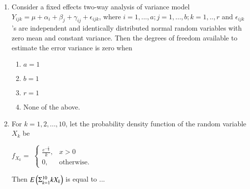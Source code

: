 \documentclass[journal]{IEEEtran}
\begin{document}
\begin{enumerate}
\item
Consider a fixed effects two-way analysis of variance model $Y_{ijk}=\mu+\alpha_i+\beta_j+\gamma_{ij}+\epsilon_{ijk}$, where $i=1, ... ,a;j=1, ... ,b;k=1, .. ,r$ and $\epsilon_{ijk}$
's are independent and identically distributed normal random variables with zero mean and constant variance. Then the degrees of freedom available to estimate the error variance is zero when
\begin{multicols}{2}
\begin{enumerate}
    \item $a=1$
    \item $b=1$
    \item $r=1$
    \item None of the above.
\end{enumerate}
\end{multicols}

\item For $k=1,2, ... ,10$, let the probability density function of the random variable $X_k$ be\\

\begin{center}
$f_{X_k}=$
$\begin{cases}
\frac{e^{-\frac{x}{k}}}{k}, & x>0\\ 
0, & \text{otherwise.}
\end{cases}$\\
\end{center}

Then $E\left(\Sigma_{k=1}^{10} k X_k\right)$ is equal to ...
\end{enumerate}
\end{document}

